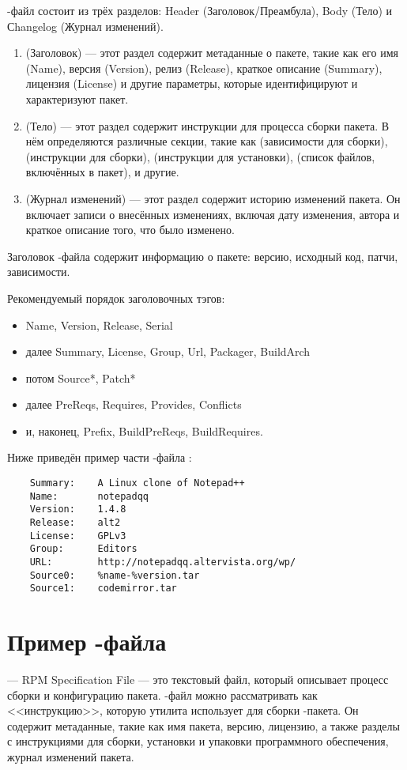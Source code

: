 -файл состоит из трёх разделов: Header (Заголовок/Преамбула), Body (Тело) и Сhangelog (Журнал изменений).
\begin{enumerate}
	\item {} (Заголовок) --- этот раздел содержит метаданные о пакете, такие как его имя (Name), 
		версия (Version), релиз (Release), краткое описание (Summary), лицензия (License) и другие 
		параметры, которые идентифицируют и характеризуют пакет.
	\item {} (Тело) --- этот раздел содержит инструкции для процесса сборки пакета. В нём 
		определяются различные секции, такие как  (зависимости для сборки), 
		 (инструкции для сборки),  (инструкции для установки), 
		 (список файлов, включённых в пакет), и другие.	
	\item {} (Журнал изменений) --- этот раздел содержит историю изменений пакета. 
		Он включает записи о внесённых изменениях, включая дату изменения, автора и краткое 
		описание того, что было изменено.
\end{enumerate}


Заголовок -файла содержит информацию о пакете: версию, исходный код, патчи, зависимости.

Рекомендуемый порядок заголовочных тэгов:
\begin{itemize}
	\item Name, Version, Release, Serial
	\item далее Summary, License, Group, Url, Packager, BuildArch
	\item потом Source*, Patch*
	\item далее PreReqs, Requires, Provides, Conflicts
	\item и, наконец, Prefix, BuildPreReqs, BuildRequires.
\end{itemize}

Ниже приведён пример части -файла :
\begin{verbatim}
	Summary:	A Linux clone of Notepad++
	Name:		notepadqq
	Version:	1.4.8
	Release:	alt2
	License:	GPLv3
	Group:		Editors
	URL:		http://notepadqq.altervista.org/wp/
	Source0:	%name-%version.tar
	Source1:	codemirror.tar
\end{verbatim}


\section{Пример -файла}
 --- RPM Specification File --- это текстовый файл, который описывает 
процесс сборки и конфигурацию пакета. -файл можно рассматривать как <<инструкцию>>, 
которую утилита  использует для сборки -пакета. Он содержит метаданные, 
такие как имя пакета, версию, лицензию, а также разделы с инструкциями для сборки, установки 
и упаковки программного обеспечения, журнал изменений пакета.

